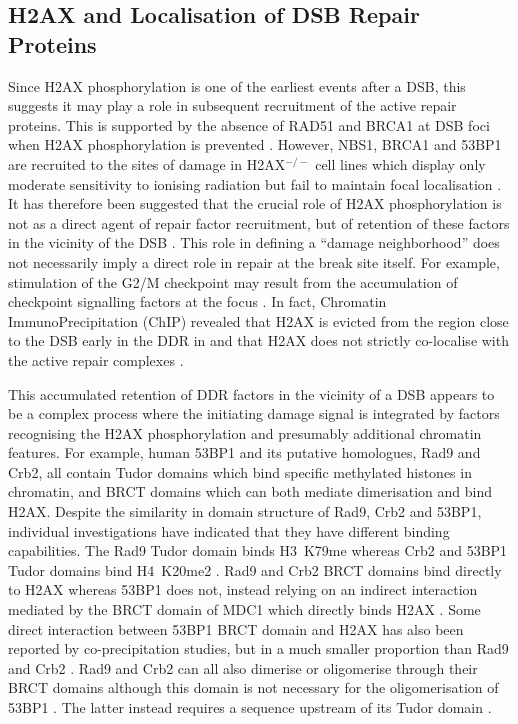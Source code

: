 \subsection{\textgamma H2AX and Localisation of DSB Repair Proteins}
Since H2AX phosphorylation is one of the earliest events after a DSB, this suggests it may play a
role in subsequent recruitment of the active repair proteins. This is supported by the absence of
RAD51 and BRCA1 at DSB foci when \textgamma H2AX phosphorylation is prevented \citep{TTP+00}. However,
NBS1, BRCA1 and 53BP1 are recruited to the sites of damage in H2AX$^{-/-}$ cell lines which display
only moderate sensitivity to ionising radiation but fail to maintain focal localisation \citep{ACOF+03}.
It has therefore been suggested that the crucial role of H2AX phosphorylation is not as a direct agent
of repair factor recruitment, but of retention of these factors in the vicinity of the DSB \citep{ACOF+03}.
This role in defining a ``damage neighborhood'' does not necessarily imply a direct role in repair at
the break site itself. For example, stimulation of the G2/M checkpoint may result from the accumulation
of checkpoint signalling factors at the focus \citep{OFHC+02}. In fact, Chromatin ImmunoPrecipitation
(ChIP) revealed that \textgamma H2AX is evicted from the region close to the DSB early in the DDR in
 and that \textgamma H2AX does not strictly co-localise with the active repair
complexes \citep{RSAA+04}.

This accumulated retention of DDR factors in the vicinity of a DSB appears to be a complex process
where the initiating damage signal is integrated by factors recognising the H2AX phosphorylation and
presumably additional chromatin features. For example, human 53BP1 and its putative homologues,
 Rad9 and  Crb2, all contain Tudor domains which bind specific
methylated histones in chromatin, and BRCT domains which can both mediate dimerisation and bind
\textgamma H2AX\@. Despite the similarity in domain structure of Rad9, Crb2 and 53BP1, individual
investigations have indicated that they have different binding capabilities. The Rad9 Tudor domain
binds H3~K79me \citep{GCJ+07,HZDJ+04} whereas Crb2 and 53BP1 Tudor domains bind H4~K20me2 \citep{SPM+04,BLW+06}.
Rad9 and Crb2 BRCT domains bind directly to \textgamma H2AX \citep{HMH+07,KDR+08} whereas 53BP1 does not,
instead relying on an indirect interaction mediated by the BRCT domain of MDC1 which directly binds
\textgamma H2AX \citep{MSL+05,MSJAC+05}. Some direct interaction between 53BP1 BRCT domain and \textgamma H2AX
has also been reported by co-precipitation studies, but in a much smaller proportion than Rad9 and
Crb2 \citep{KDR+08}. Rad9 and Crb2 can all also dimerise or oligomerise through their BRCT domains \citep{SL99,DMR04}
although this domain is not necessary for the oligomerisation of 53BP1 \citep{AWX+05}. The latter
instead requires a sequence upstream of its Tudor domain \citep{WKM+06}.

